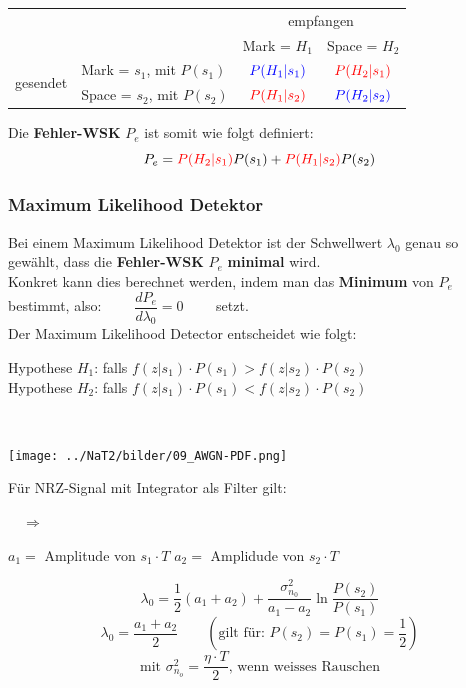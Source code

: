 \begin{minipage}[c]{10cm}
	\begin{center}
	 	\begin{tabular}{l l|c|c|}
	 		\cline{3-4} 
	 			& & \multicolumn{2}{c|}{empfangen} \\
			\cline{3-4}
				& & Mark = $H_1$ & Space = $H_2$ \\
			\hline
				 \multicolumn{1}{|l|}{\multirow{2}{*}{  gesendet }} 
				 & Mark = $s_1$, mit $P(s_1)$ & $\textcolor{blue}{P(H_1 | s_1)}$ 
				 &  $\textcolor{red}{P(H_2 | s_1)}$\\
			\cline{2-4}
				\multicolumn{1}{|l|}{} & Space = $s_2$, mit $P(s_2)$ & $\textcolor{red}{P(H_1 | s_2)}$ 
				& $\textcolor{blue}{P(H_2 | s_2)}$ \\
			\hline
		\end{tabular}  
  	\end{center}
\end{minipage}
\begin{minipage}[c]{8cm}
	Die \textbf{Fehler-WSK} $P_e$ ist somit wie folgt definiert:
	$$ P_e = \textcolor{red}{P(H_2 | s_1)} P(s_1) + \textcolor{red}{P(H_1 | s_2)}
	P(s_2)$$
\end{minipage} 

\subsubsection{Maximum Likelihood Detektor }
Bei einem Maximum Likelihood Detektor ist der Schwellwert $\lambda_0$ genau so gewählt, dass die
\textbf{Fehler-WSK }$P_e$ \textbf{minimal} wird. \\
Konkret kann dies berechnet werden, indem man das \textbf{Minimum} von $P_e$ bestimmt, also: $\qquad
\dfrac{d P_e}{d \lambda_0} = 0 \qquad$ setzt. \\ 
Der Maximum Likelihood Detector entscheidet wie folgt: \qquad \parbox[c]{9cm}{Hypothese $H_1$: \quad falls $f(z|s_1)\cdot P(s_1) > f(z|s_2)\cdot P(s_2)$\\
Hypothese $H_2$: \quad falls $f(z|s_1)\cdot P(s_1) < f(z|s_2)\cdot P(s_2)$}\\

\begin{minipage}[c]{9.5cm}
 	\texttt{[image: ../NaT2/bilder/09\_AWGN-PDF.png]} \newline
	 \begin{minipage}{3.5cm}
	 	 	Für NRZ-Signal mit Integrator als Filter gilt:
	 \end{minipage}
	 	$\quad \Rightarrow \quad$
	 \begin{minipage}{5cm}
	 	$a_1 = $ Amplitude von $s_1 \cdot T$ \newline
	 	$a_2 = $ Amplidude von $s_2 \cdot T$
	 \end{minipage}
\end{minipage}
\begin{minipage}[c]{7cm}
	 $$ \lambda_0 = \dfrac{1}{2} (a_1 + a_2) + \dfrac{\sigma_{n_0}^2}{a_1 - a_2}
 \ln\dfrac{P(s_2)}{P(s_1)} $$ 
 	$$ \lambda_0 = \dfrac{a_1 + a_2}{2} \qquad (\text{gilt für: } P(s_2) = P(s_1) = \dfrac{1}{2})
 	$$
 	$$ \text{mit } \sigma_{n_o}^2 = \frac{\eta \cdot T}{2}\text{, wenn weisses Rauschen}$$
\end{minipage} 


